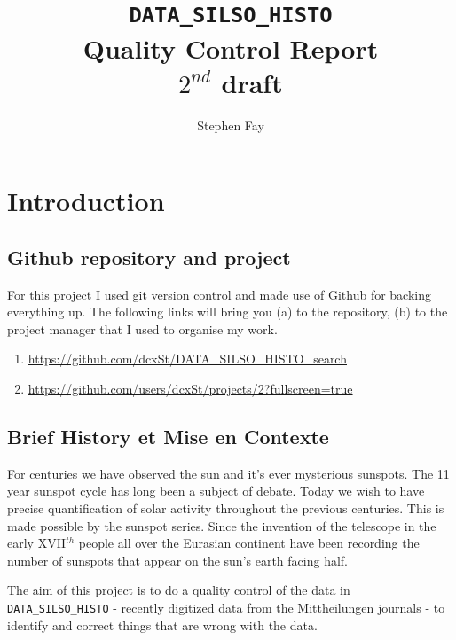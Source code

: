 \documentclass[12pt]{article}
\renewcommand\qedsymbol{$\Smiley$}
\begin{document}
 
 
\title{\texttt{DATA\_SILSO\_HISTO}\\Quality Control Report\\$2^{nd}$ draft}
\author{Stephen Fay}
\maketitle

\tableofcontents

\section{Introduction}
\subsection{Github repository and project}
For this project I used git version control and made use of Github for backing everything up. The following links will bring you (a) to the repository, (b) to the project manager that I used to organise my work.
\begin{enumerate}[(\alph*)]
    \item \href{https://github.com/dcxSt/DATA\_SILSO\_HISTO\_search}{https://github.com/dcxSt/DATA\_SILSO\_HISTO\_search}
    \item \href{https://github.com/users/dcxSt/projects/2?fullscreen=true}{https://github.com/users/dcxSt/projects/2?fullscreen=true}
\end{enumerate}

    
\subsection{Brief History et Mise en Contexte}

For centuries we have observed the sun and it's ever mysterious sunspots. The 11 year sunspot cycle has long been a subject of debate. Today we wish to have precise quantification of solar activity throughout the previous centuries. This is made possible by the sunspot series. Since the invention of the telescope in the early XVII$^{th}$ people all over the Eurasian continent have been recording the number of sunspots that appear on the sun's earth facing half. 

The aim of this project is to do a quality control of the data in \texttt{DATA\_SILSO\_HISTO} - recently digitized data from the Mittheilungen journals - to identify and correct things that are wrong with the data.
\end{document}
